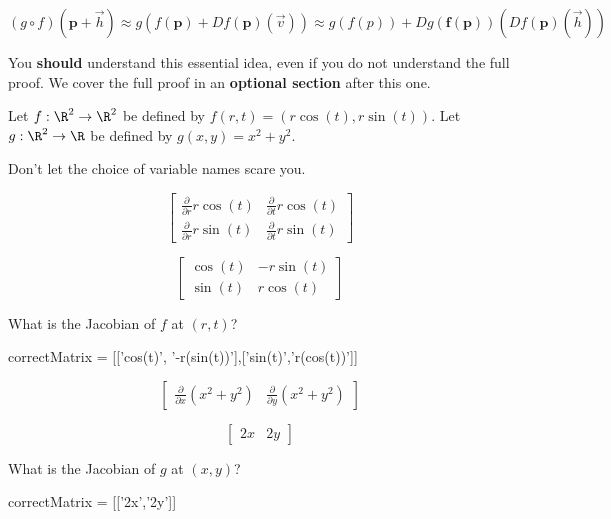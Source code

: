 \documentclass{ximera}
\begin{document}
\[
	(g \circ f)(\mathbf{p} +\vec{h}) \approx g(f(\mathbf{p}) + Df(\mathbf{p})(\vec{v})) \approx g(f(p)) + Dg(\mathbf{f(p)})(Df(\mathbf{p})(\vec{h}))
\]

You \textbf{should} understand this essential idea, even if you do not understand the full proof.  We cover the full proof in an \textbf{optional section} after this one.

\begin{question}
	Let $f:\R^2 \to \R^2$ be defined by $f(r,t) = (r\cos(t),r\sin(t))$.  Let $g:\R^2 \to \R$ be defined by $g(x,y) = x^2+y^2$. 
	
	Don't let the choice of variable names scare you.
	
	\begin{solution}
		\begin{hint}
			\[\begin{bmatrix}  
			\frac{\partial}{ \partial r} r\cos(t)& \frac{\partial}{ \partial t}  r\cos(t)
			\\  
			\frac{\partial}{ \partial r} r\sin(t)& \frac{\partial}{ \partial t} r\sin(t)
			\end{bmatrix}\]
		\end{hint}
		\begin{hint}
			\[\begin{bmatrix}  
			\cos(t) & -r\sin(t)
			\\  
			\sin(t) & r\cos(t)
			\end{bmatrix}\]
		\end{hint}
		What is the Jacobian of $f$ at $(r,t)$?
		\begin{matrix-answer}[name =J]
			correctMatrix = [['cos(t)', '-r(sin(t))'],['sin(t)','r(cos(t))']]
		\end{matrix-answer}
	\end{solution}
	
	\begin{solution}
		\begin{hint}
			 \[ \begin{bmatrix} \frac{\partial}{\partial x} (x^2+y^2)& \frac{\partial}{\partial y} (x^2+y^2) \end{bmatrix}\]
		\end{hint}
		\begin{hint}
			 \[ \begin{bmatrix} 2x & 2y \end{bmatrix}\]
		\end{hint}
		What is the Jacobian of $g$ at $(x,y)$?
		\begin{matrix-answer}
			correctMatrix = [['2x','2y']]
		\end{matrix-answer}
	\end{solution}
	

\end{question}
\end{document}
